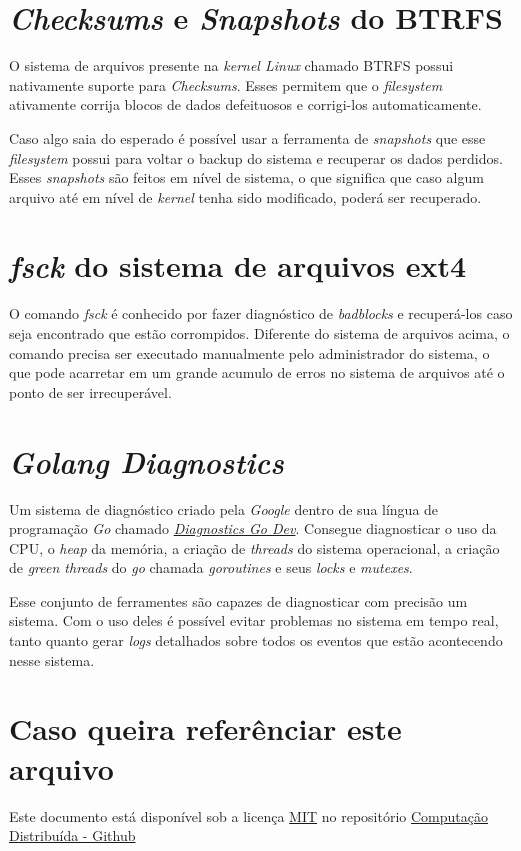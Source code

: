 \section*{\emph{Checksums} e \emph{Snapshots} do BTRFS}

O sistema de arquivos presente na \emph{kernel Linux} chamado BTRFS possui nativamente
suporte para \emph{Checksums}. Esses permitem que o \emph{filesystem} ativamente corrija
blocos de dados defeituosos e corrigi-los automaticamente.

Caso algo saia do esperado é possível usar a ferramenta de \emph{snapshots} que esse \emph{filesystem}
possui para voltar o backup do sistema e recuperar os dados perdidos. Esses \emph{snapshots} são
feitos em nível de sistema, o que significa que caso algum arquivo até em nível de \emph{kernel} tenha sido
modificado, poderá ser recuperado.

\section*{\emph{fsck} do sistema de arquivos ext4}

O comando \emph{fsck} é conhecido por fazer diagnóstico de \emph{badblocks} e recuperá-los 
caso seja encontrado que estão corrompidos. Diferente do sistema de arquivos acima, o comando
precisa ser executado manualmente pelo administrador do sistema, o que pode acarretar em um grande acumulo
de erros no sistema de arquivos até o ponto de ser irrecuperável.

\section*{\emph{Golang Diagnostics}}

Um sistema de diagnóstico criado pela \emph{Google} dentro de sua língua de programação \emph{Go} chamado
\href{https://go.dev/doc/diagnostics}{\emph{Diagnostics Go Dev}}. Consegue diagnosticar o uso da CPU, 
o \emph{heap} da memória, a criação de \emph{threads} do sistema operacional, a criação de \emph{green threads}
do \emph{go} chamada \emph{goroutines} e seus \emph{locks} e \emph{mutexes}.

Esse conjunto de ferramentes são capazes de diagnosticar com precisão um sistema. Com o uso deles é possível
evitar problemas no sistema em tempo real, tanto quanto gerar \emph{logs} detalhados sobre todos os eventos 
que estão acontecendo nesse sistema.


\section*{Caso queira referênciar este arquivo}

Este documento está disponível sob a licença \href{https://choosealicense.com/licenses/mit/}{MIT} no repositório
\href{https://github.com/Trees-Over-The-Lake/Computacao-Distribuida/blob/main/Tarefa%205/main.pdf}{Computação Distribuída - Github}